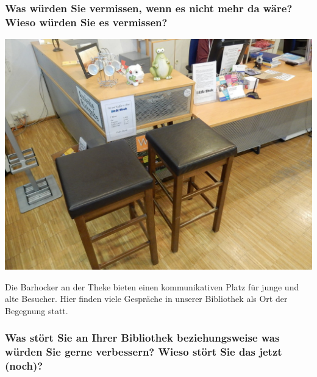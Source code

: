 \hypertarget{was-wuxfcrden-sie-vermissen-wenn-es-nicht-mehr-da-wuxe4re-wieso-wuxfcrden-sie-es-vermissen}{%
\subsubsection*{Was würden Sie vermissen, wenn es nicht mehr da wäre? Wieso
würden Sie es
vermissen?}\label{was-wuxfcrden-sie-vermissen-wenn-es-nicht-mehr-da-wuxe4re-wieso-wuxfcrden-sie-es-vermissen}}

\begin{center}
\includegraphics{stiftung-pfennigparade/img/barhocker.jpg}
\end{center}

Die Barhocker an der Theke bieten einen kommunikativen Platz für junge
und alte Besucher. Hier finden viele Gespräche in unserer Bibliothek als
Ort der Begegnung statt.

\hypertarget{was-stuxf6rt-sie-an-ihrer-bibliothek-beziehungsweise-was-wuxfcrden-sie-gerne-verbessern-wieso-stuxf6rt-sie-das-jetzt-noch}{%
\subsubsection*{Was stört Sie an Ihrer Bibliothek beziehungsweise was würden
Sie gerne verbessern? Wieso stört Sie das jetzt
(noch)?}\label{was-stuxf6rt-sie-an-ihrer-bibliothek-beziehungsweise-was-wuxfcrden-sie-gerne-verbessern-wieso-stuxf6rt-sie-das-jetzt-noch}}

